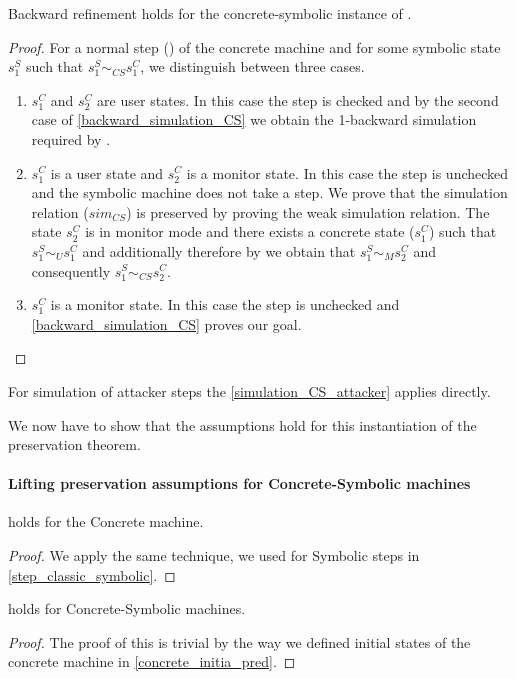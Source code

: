 \begin{theorem}
\label{backward_refinement_normal_CS}
  Backward refinement holds for the concrete-symbolic instance
  of . 
\end{theorem}
\begin{proof}
  For a normal step () of the concrete machine and
  for some symbolic state $s^S_1$ such that $s^S_1 \sim_{CS} s^C_1$,
  we distinguish between three cases.

  \begin{enumerate}
  \item $s^C_1$ and $s^C_2$ are user states. In this case the step is
    checked and by the second case of \cref{backward_simulation_CS} we obtain
    the 1-backward simulation required by .
  \item $s^C_1$ is a user state and $s^C_2$ is a monitor state. In this case
    the step is unchecked and the symbolic machine does not take a step.
    We prove that the simulation relation ($sim_{CS}$) is preserved by
    proving the weak simulation relation. The state $s^C_2$ is in
    monitor mode and there exists a concrete state ($s^C_1$) such that
    $s^S_1 \sim_U s^C_1$ and additionally  therefore
    by  we obtain that
    $s^S_1 \sim_M s^C_2$ and consequently $s^S_1 \sim_{CS} s^C_2$.
  \item $s^C_1$ is a monitor state. In this case the step is
    unchecked and \cref{backward_simulation_CS} proves
    our goal.
  \end{enumerate}
\end{proof}

For simulation of attacker steps the \cref{simulation_CS_attacker}
applies directly.

We now have to show that the assumptions 
hold for this instantiation of the preservation theorem.

\paragraph{Lifting preservation assumptions for Concrete-Symbolic machines}

\begin{lemma}
  \label{step_classic_concrete}
   holds for the Concrete machine.
\end{lemma}
\begin{proof}
  We apply the same technique, we used for Symbolic steps in
  \cref{step_classic_symbolic}.
\end{proof}
\begin{lemma}
  \label{initial_refine_CS}
   holds for Concrete-Symbolic machines.
\end{lemma}
\begin{proof}
  The proof of this is trivial by the way we defined initial states of
  the concrete machine in \cref{concrete_initia_pred}.
\end{proof}

